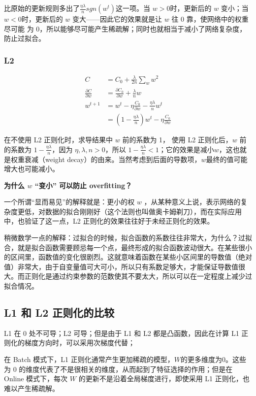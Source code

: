 \documentclass[12pt]{article}
\begin{document}
比原始的更新规则多出了$\frac{\eta\lambda}{n}sgn(w^t)$这一项。当 $w > 0$时，更新后的 $w$ 变小；当 $w < 0$时，更新后的 $w$ 变大——因此它的效果就是让 $w$ 往 0 靠，使网络中的权重尽可能 为 0，所以能够尽可能产生稀疏解；同时也就相当于减小了网络复杂度，防止过拟合。

\subsubsection{L2}
\begin{align}
     C &= C_0 + \frac{\lambda}{2n}\sum_{w}w^2 \\
     \frac{\partial C}{\partial w} &= \frac{\partial C_0}{\partial w} + \frac{\lambda}{n}w \\
     w^{t+1} &= w^t - \eta\frac{C_0}{\partial w} - \frac{\eta\lambda}{n}w^t \\
     &= (1-\frac{\eta\lambda}{n})w^t - \eta\frac{C_0}{\partial w}
\end{align}

在不使用 L2 正则化时，求导结果中 $w$ 前的系数为 1， 使用 L2 正则化后，$w$ 前的系数为 $1-\frac{\eta\lambda}{n}$，因为 $\eta, \lambda, n > 0$，所以 $1-\frac{\eta\lambda}{n} < 1$；它的效果是减小$w$，这也就是权重衰减（weight decay）的由来。当然考虑到后面的导数项，$w$最终的值可能增大也可能减小。

\textbf{为什么 $w$ “变小” 可以防止 overfitting？}

一个所谓“显而易见”的解释就是：更小的权 
$w$ ，从某种意义上说，表示网络的复杂度更低，对数据的拟合刚刚好（这个法则也叫做奥卡姆剃刀），而在实际应用中，也验证了这一点，L2 正则化的效果往往好于未经正则化的效果。

稍微数学一点的解释：过拟合的时候，拟合函数的系数往往非常大，为什么？过拟合，就是拟合函数需要顾忌每一个点，最终形成的拟合函数波动很大。在某些很小的区间里，函数值的变化很剧烈。这就意味着函数在某些小区间里的导数值（绝对值）非常大，由于自变量值可大可小，所以只有系数足够大，才能保证导数值很大。而正则化是通过约束参数的范数使其不要太大，所以可以在一定程度上减少过拟合情况。

\subsection{L1 和 L2 正则化的比较}
L1 在 0 处不可导；L2 可导；但是由于 L1 和 L2 都是凸函数，因此在计算 L1 正则化的梯度方向时，可以采用次梯度代替；

在 Batch 模式下，L1 正则化通常产生更加稀疏的模型，$W$的更多维度为0。这些为 0 的维度代表了不是很相关的维度，从而起到了特征选择的作用；但是在 Online 模式下，每次 $W$ 的更新不是沿着全局梯度进行，即使采用 L1 正则化，也难以产生稀疏解。
\end{document}

